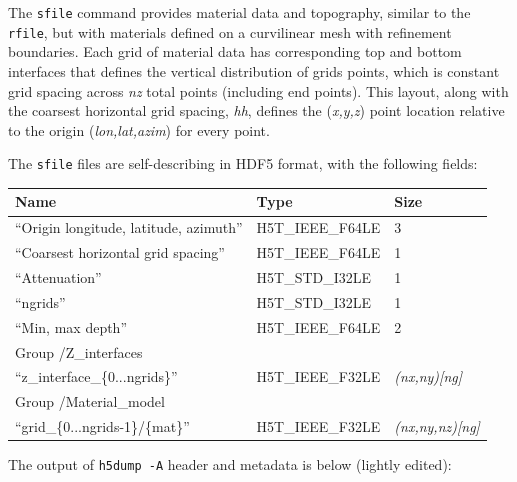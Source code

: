 \documentclass[11pt]{report}
\begin{document}
The \verb+sfile+ command provides material data and topography, 
  similar  to the \verb+rfile+, but with materials defined on
  a curvilinear mesh with refinement boundaries.
Each grid of material data has corresponding top and bottom interfaces
  that defines the vertical distribution of grids points, which is constant
  grid spacing across {\em nz} total points (including end points).
This layout, along with the coarsest horizontal grid spacing, {\em hh}, defines
  the ({\em x,y,z}) point location relative to the origin ({\em lon,lat,azim})
  for every point.

The \verb+sfile+ files are self-describing in HDF5 format, with
  the following fields:
\begin{center}
\begin{tabular}{lll}\hline
Name & Type & Size \\ \hline
  ``Origin longitude, latitude, azimuth'' & H5T\_IEEE\_F64LE & 3 \\ \hline
  ``Coarsest horizontal grid spacing'' & H5T\_IEEE\_F64LE & 1 \\ \hline
  ``Attenuation'' & H5T\_STD\_I32LE & 1 \\ \hline
  ``ngrids'' & H5T\_STD\_I32LE & 1 \\ \hline
  ``Min, max depth'' & H5T\_IEEE\_F64LE & 2 \\ \hline
Group /Z\_interfaces \\ \hline
  ``z\_interface\_\{0...ngrids\}'' & H5T\_IEEE\_F32LE & {\em (nx,ny)[ng]}  \\ \hline
Group /Material\_model \\ \hline
  ``grid\_\{0...ngrids-1\}/\{mat\}'' & H5T\_IEEE\_F32LE & {\em (nx,ny,nz)[ng]} \\ \hline
\end{tabular}
\end{center}

The output of {\tt h5dump -A} header and metadata is below (lightly edited):
\end{document}
